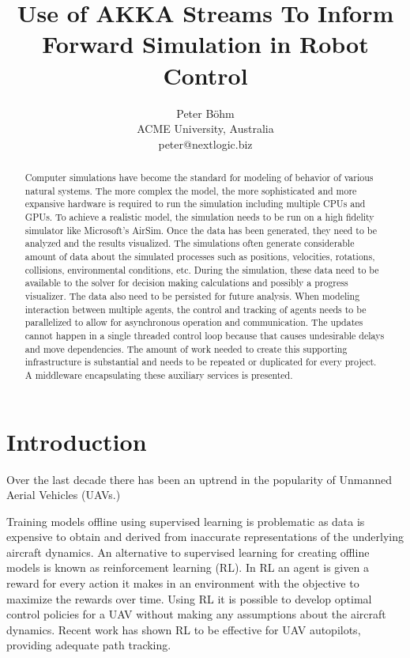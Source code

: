 \documentclass{article}
\title{Use of AKKA Streams To Inform Forward Simulation in Robot Control}
\author{Peter Böhm\\ 
	ACME University, Australia\\ 
peter@nextlogic.biz}
\begin{document}
\maketitle

\begin{abstract}
Computer simulations have become the standard for modeling of behavior of various natural systems. The more complex the model, the more sophisticated and more expansive hardware is required to run the simulation including multiple CPUs and GPUs. To achieve a realistic model, the simulation needs to be run on a high fidelity simulator like Microsoft's AirSim. Once the data has been generated, they need to be analyzed and the results visualized. The simulations often generate considerable amount of data about the simulated processes such as positions, velocities, rotations, collisions, environmental conditions, etc. During the simulation, these data need to be available to the solver for decision making calculations and possibly a progress visualizer. The data also need to be persisted for future analysis. When modeling interaction between multiple agents, the control and tracking of agents needs to be parallelized to allow for asynchronous operation and communication. The updates cannot happen in a single threaded control loop because that causes undesirable delays and move dependencies. The amount of work needed to create this supporting infrastructure is substantial and needs to be repeated or duplicated for every project. A middleware encapsulating these auxiliary services is presented.
\end{abstract}

\section{Introduction}

Over the last decade there has been an uptrend in the popularity of Unmanned Aerial Vehicles (UAVs.)

Training models offline using supervised learning is problematic as data is expensive to obtain and derived from inaccurate representations of the underlying aircraft dynamics. An alternative to supervised learning for creating offline models is known as reinforcement learning (RL). In RL an agent is given a reward for every action it makes in an environment with the objective to maximize the rewards over time. Using RL it is possible to develop optimal control policies for a UAV without making any assumptions about the aircraft dynamics. Recent work has shown RL to be effective for UAV autopilots, providing adequate path tracking. \cite{rlForUAVs}
\end{document}

